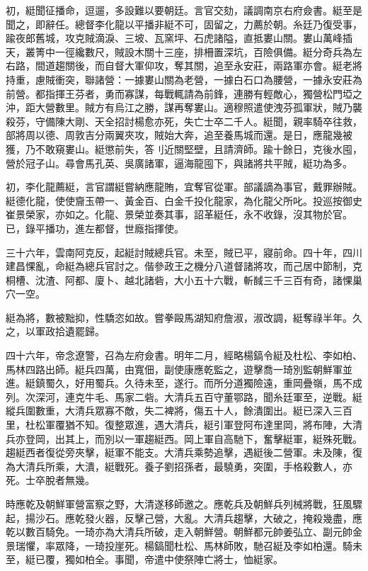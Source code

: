 \begin{pinyinscope}
初，綎聞征播命，逗遛，多設難以要朝廷。言官交劾，議調南京右府僉書。綎至是聞之，即辭任。總督李化龍以平播非綎不可，固留之，力薦於朝。糸廷乃復受事，踰夜郎舊城，攻克賊滴淚、三坡、瓦窯坪、石虎諸隘，直抵婁山關。婁山萬峰插天，叢箐中一徑纔數尺，賊設木關十三座，排柵置深坑，百險俱備。綎分奇兵為左右路，間道趨關後，而自督大軍仰攻，奪其關，追至永安莊，兩路軍亦會。綎老將持重，慮賊衝突，聯諸營：一據婁山關為老營，一據白石口為腰營，一據永安莊為前營。都指揮王芬者，勇而寡謀，每戰輒請為前鋒，連勝有輕敵心，獨營松門埡之沖，距大營數里。賊方有烏江之勝，謀再奪婁山。適穆照遣使洩芬孤軍狀，賊乃襲殺芬，守備陳大剛、天全招討楊愈亦死，失亡士卒二千人。綎聞，親率騎卒往救，部將周以德、周敦吉分兩翼夾攻，賊始大奔，追至養馬城而還。是日，應龍幾被獲，乃不敢窺婁山。綎懲前失，答刂近關堅壁，且請濟師。踰十餘日，克後水囤，營於冠子山。尋會馬孔英、吳廣諸軍，逼海龍囤下，與諸將共平賊，綎功為多。

初，李化龍薦綎，言官謂綎嘗納應龍賄，宜奪官從軍。部議謫為事官，戴罪辦賊。綎德化龍，使使齎玉帶一、黃金百、白金千投化龍家，為化龍父所叱。投巡按御史崔景榮家，亦如之。化龍、景榮並奏其事，詔革綎任，永不收錄，沒其物於官。已，錄平播功，進左都督，世廕指揮使。

三十六年，雲南阿克反，起綎討賊總兵官。未至，賊已平，寢前命。四十年，四川建昌惈亂，命綎為總兵官討之。偕參政王之機分八道督諸將攻，而己居中節制，克桐槽、沈渣、阿都、廈卜、越北諸砦，大小五十六戰，斬馘三千三百有奇，諸惈巢穴一空。

綎為將，數被黜抑，性驕恣如故。嘗拳毆馬湖知府詹淑，淑改調，綎奪祿半年。久之，以軍政拾遺罷歸。

四十六年，帝念遼警，召為左府僉書。明年二月，經略楊鎬令綎及杜松、李如柏、馬林四路出師。綎兵四萬，由寬佃，副使康應乾監之，遊擊喬一琦別監朝鮮軍並進。綎鎮蜀久，好用蜀兵。久待未至，遂行。而所分道獨險遠，重岡疊嶺，馬不成列。次深河，連克牛毛、馬家二砦。大清兵五百守董鄂路，聞糸廷軍至，逆戰。綎縱兵圍數重，大清兵眾寡不敵，失二裨將，傷五十人，餘潰圍出。綎已深入三百里，杜松軍覆猶不知。復整眾進，遇大清兵，綎引軍登阿布達里岡，將布陣，大清兵亦登岡，出其上，而別以一軍趨綎西。岡上軍自高馳下，奮擊綎軍，綎殊死戰。趨綎西者復從旁夾擊，綎軍不能支。大清兵乘勢追擊，遇綎後二營軍。未及陳，復為大清兵所乘，大潰，綎戰死。養子劉招孫者，最驍勇，突圍，手格殺數人，亦死。士卒脫者無幾。

時應乾及朝鮮軍營富察之野，大清遂移師邀之。應乾兵及朝鮮兵列械將戰，狂風驟起，揚沙石。應乾發火器，反擊己營，大亂。大清兵趨擊，大破之，掩殺幾盡，應乾以數百騎免。一琦亦為大清兵所破，走入朝鮮營。朝鮮都元帥姜弘立、副元帥金景瑞懼，率眾降，一琦投崖死。楊鎬聞杜松、馬林師敗，馳召綎及李如柏還。騎未至，綎已覆，獨如柏全。事聞，帝遣中使祭陣亡將士，恤綎家。


\end{pinyinscope}
